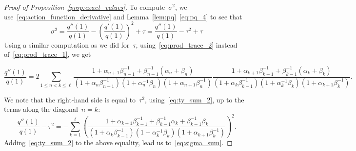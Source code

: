 \documentclass[11pt]{article}
\theoremstyle{plain}
\theoremstyle{definition}
\numberwithin{equation}{section}
\begin{document}
\begin{proof}[Proof of Proposition~\ref{prop:exact_values}]
To compute~$\sigma^2$, we use~\eqref{eq:action_function_derivative} and Lemma~\ref{lem:pq}~\eqref{eq:pq_4} to see that
\begin{equation}
\sigma^2=\frac{q''(1)}{q(1)}-\left(\frac{q'(1)}{q(1)}\right)^2+\tau =\frac{q''(1)}{q(1)}-\tau ^2+\tau 
\end{equation}
Using a similar computation as we did for~$\tau $, using~\eqref{eq:prod_trace_2} instead of~\eqref{eq:prod_trace_1}, we get
\begin{small}
\begin{equation}
\frac{q''(1)}{q(1)}
=2\sum_{1\leq n<k\leq \ell} \frac{1+\alpha_{n+1}\beta_{n-1}^{-1}+\beta_{n-1}^{-1}(\alpha_n+\beta_n)}
{(1+\alpha_n\beta_{n-1}^{-1})(1+\alpha_n^{-1}\beta_n)(1+\alpha_{n+1}\beta_n^{-1})}
\frac{1+\alpha_{k+1}\beta_{k-1}^{-1}+\beta_{k-1}^{-1}(\alpha_k+\beta_k)}
{(1+\alpha_k\beta_{k-1}^{-1})(1+\alpha_k^{-1}\beta_k)(1+\alpha_{k+1}\beta_k^{-1})}.
\end{equation}
\end{small}
We note that the right-hand side is equal to~$\tau ^2$, using~\eqref{eq:ty_sum_2}, up to the terms along the diagonal~$n=k$:
\begin{equation}
\frac{q''(1)}{q(1)}-\tau ^2=
-\sum_{k=1}^\ell \left(\frac{1+\alpha_{k+1}\beta_{k-1}^{-1}+\beta_{k-1}^{-1}\alpha_k+\beta_{k-1}^{-1}\beta_k}
{(1+\alpha_k\beta_{k-1}^{-1})(1+\alpha_k^{-1}\beta_k)(1+\alpha_{k+1}\beta_k^{-1})}\right)^2.
\end{equation}
Adding~\eqref{eq:ty_sum_2} to the above equality, lead us to~\eqref{eq:sigma_sum}.
\end{proof}

%



%

\end{document}
